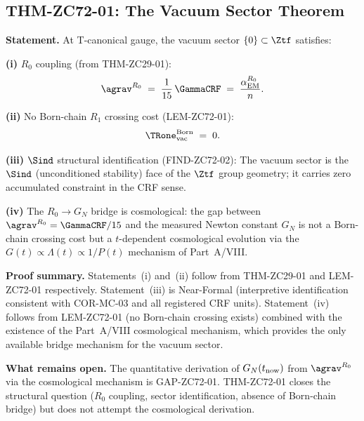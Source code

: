 \documentclass[12pt, a4paper]{article}
\renewcommand{\aEM}{\alpha_{\rm EM}}
\begin{document}
\subsection{THM-ZC72-01: The Vacuum Sector Theorem}
\label{sec:thm01}


\begin{formalbox}[title={THM-ZC72-01: Vacuum Sector Theorem
  ($R_0$, Exact; Bridge Open)}]

\textbf{Statement.}
At T-canonical gauge, the vacuum sector $\{0\} \subset \Ztf$
satisfies:

\medskip
\textbf{(i)} $R_0$ coupling (from THM-ZC29-01):
\begin{equation}
  \agrav^{R_0}
  \;=\;
  \frac{1}{15}\,\GammaCRF
  \;=\;
  \frac{\aEM^{R_0}}{n}.
  \label{eq:grav-coupling}
\end{equation}

\textbf{(ii)} No Born-chain $R_1$ crossing cost (LEM-ZC72-01):
\begin{equation}
  \TRone_{\rm vac}^{\rm Born} \;=\; 0.
  \label{eq:grav-crossing}
\end{equation}

\textbf{(iii)} $\Sind$ structural identification (FIND-ZC72-02):
The vacuum sector is the $\Sind$ (unconditioned stability) face of
the $\Ztf$ group geometry; it carries zero accumulated constraint
in the CRF sense.

\textbf{(iv)} The $R_0 \to G_N$ bridge is cosmological:
the gap between $\agrav^{R_0} = \GammaCRF/15$ and the measured
Newton constant $G_N$ is not a Born-chain crossing cost
but a $t$-dependent cosmological evolution via the
$G(t) \propto \Lambda(t) \propto 1/P(t)$ mechanism of
Part~A/VIII.

\textbf{Proof summary.}
Statements~(i) and~(ii) follow from THM-ZC29-01 and LEM-ZC72-01
respectively.
Statement~(iii) is Near-Formal (interpretive identification
consistent with COR-MC-03 and all registered CRF units).
Statement~(iv) follows from LEM-ZC72-01 (no Born-chain crossing
exists) combined with the existence of the Part~A/VIII
cosmological mechanism, which provides the only available
bridge mechanism for the vacuum sector.

\textbf{What remains open.}
The quantitative derivation of $G_N(t_{\rm now})$ from
$\agrav^{R_0}$ via the cosmological mechanism is
GAP-ZC72-01. THM-ZC72-01 closes the structural question
($R_0$ coupling, sector identification, absence of Born-chain
bridge) but does not attempt the cosmological derivation.


\end{formalbox}
\end{document}
